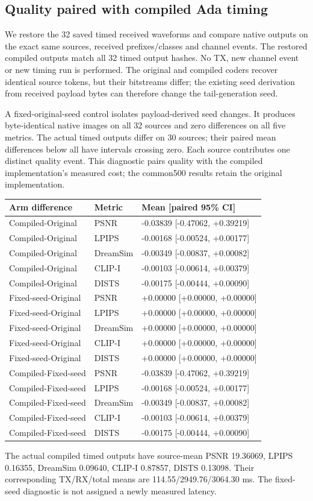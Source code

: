 \documentclass[10pt,letterpaper]{article}
\begin{document}
\subsection{Quality paired with compiled Ada timing}\label{sup:timing-compiled-quality}
We restore the 32 saved timed received waveforms and compare native outputs on the exact same sources, received prefixes/classes and channel events. The restored compiled outputs match all 32 timed output hashes. No TX, new channel event or new timing run is performed. The original and compiled coders recover identical source tokens, but their bitstreams differ; the existing seed derivation from received payload bytes can therefore change the tail-generation seed.

A fixed-original-seed control isolates payload-derived seed changes. It produces byte-identical native images on all 32 sources and zero differences on all five metrics. The actual timed outputs differ on 30 sources; their paired mean differences below all have intervals crossing zero. Each source contributes one distinct quality event. This diagnostic pairs quality with the compiled implementation's measured cost; the common500 results retain the original implementation.

\begin{longtable}{@{}lll@{}}\toprule
Arm difference & Metric & Mean [paired 95\% CI]\\\midrule\endhead
Compiled-Original & PSNR & -0.03839 [-0.47062, +0.39219]\\
Compiled-Original & LPIPS & -0.00168 [-0.00524, +0.00177]\\
Compiled-Original & DreamSim & -0.00349 [-0.00837, +0.00082]\\
Compiled-Original & CLIP-I & -0.00103 [-0.00614, +0.00379]\\
Compiled-Original & DISTS & -0.00175 [-0.00444, +0.00090]\\
Fixed-seed-Original & PSNR & +0.00000 [+0.00000, +0.00000]\\
Fixed-seed-Original & LPIPS & +0.00000 [+0.00000, +0.00000]\\
Fixed-seed-Original & DreamSim & +0.00000 [+0.00000, +0.00000]\\
Fixed-seed-Original & CLIP-I & +0.00000 [+0.00000, +0.00000]\\
Fixed-seed-Original & DISTS & +0.00000 [+0.00000, +0.00000]\\
Compiled-Fixed-seed & PSNR & -0.03839 [-0.47062, +0.39219]\\
Compiled-Fixed-seed & LPIPS & -0.00168 [-0.00524, +0.00177]\\
Compiled-Fixed-seed & DreamSim & -0.00349 [-0.00837, +0.00082]\\
Compiled-Fixed-seed & CLIP-I & -0.00103 [-0.00614, +0.00379]\\
Compiled-Fixed-seed & DISTS & -0.00175 [-0.00444, +0.00090]\\
\bottomrule\end{longtable}
The actual compiled timed outputs have source-mean PSNR 19.36069, LPIPS 0.16355, DreamSim 0.09640, CLIP-I 0.87857, DISTS 0.13098. Their corresponding TX/RX/total means are 114.55/2949.76/3064.30 ms. The fixed-seed diagnostic is not assigned a newly measured latency.
\end{document}
